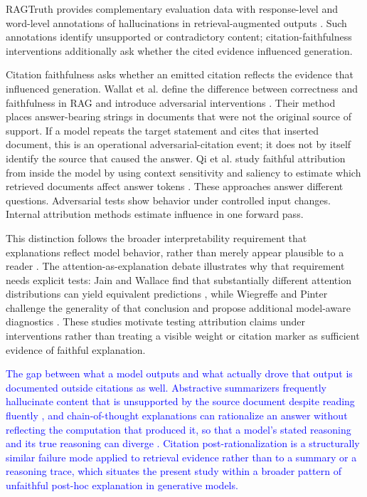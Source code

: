 \documentclass[a4paper,fleqn]{cas-sc}
\begin{document}
RAGTruth provides complementary evaluation data with response-level and word-level annotations of hallucinations in retrieval-augmented outputs \cite{niu2024ragtruth}. Such annotations identify unsupported or contradictory content; citation-faithfulness interventions additionally ask whether the cited evidence influenced generation.

Citation faithfulness asks whether an emitted citation reflects the evidence that influenced generation. Wallat et al. define the difference between correctness and faithfulness in RAG and introduce adversarial interventions \cite{wallat2025correctness}. Their method places answer-bearing strings in documents that were not the original source of support. If a model repeats the target statement and cites that inserted document, this is an operational adversarial-citation event; it does not by itself identify the source that caused the answer. Qi et al. study faithful attribution from inside the model by using context sensitivity and saliency to estimate which retrieved documents affect answer tokens \cite{qi2024mirage}. These approaches answer different questions. Adversarial tests show behavior under controlled input changes. Internal attribution methods estimate influence in one forward pass.

This distinction follows the broader interpretability requirement that explanations reflect model behavior, rather than merely appear plausible to a reader \cite{jacovi2020faithful}. The attention-as-explanation debate illustrates why that requirement needs explicit tests: Jain and Wallace find that substantially different attention distributions can yield equivalent predictions \cite{jain2019attention}, while Wiegreffe and Pinter challenge the generality of that conclusion and propose additional model-aware diagnostics \cite{wiegreffe2019attention}. These studies motivate testing attribution claims under interventions rather than treating a visible weight or citation marker as sufficient evidence of faithful explanation.

\textcolor{blue}{The gap between what a model outputs and what actually drove that output is documented outside citations as well. Abstractive summarizers frequently hallucinate content that is unsupported by the source document despite reading fluently \cite{maynez2020faithfulness}, and chain-of-thought explanations can rationalize an answer without reflecting the computation that produced it, so that a model's stated reasoning and its true reasoning can diverge \cite{turpin2023unfaithful}. Citation post-rationalization is a structurally similar failure mode applied to retrieval evidence rather than to a summary or a reasoning trace, which situates the present study within a broader pattern of unfaithful post-hoc explanation in generative models.}
\end{document}
